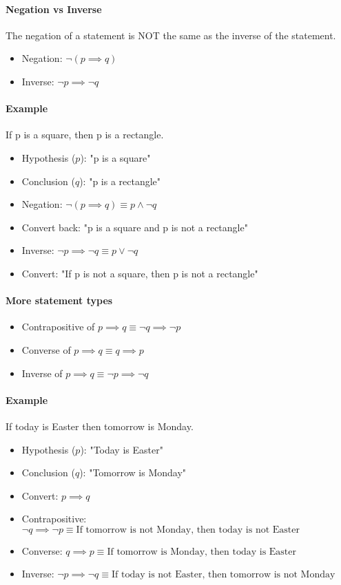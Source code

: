 \paragraph*{Negation vs Inverse}
The negation of a statement is NOT the same as the inverse of the statement.
\begin{itemize}
    \item Negation: $\neg (p \implies q)$
    \item Inverse: $\neg p \implies \neg q$
\end{itemize}

\paragraph*{Example}
If p is a square, then p is a rectangle.
\begin{itemize}
    \item Hypothesis ($p$): "p is a square"
    \item Conclusion ($q$): "p is a rectangle"
    \item Negation: $\neg (p \implies q) \equiv p \land \neg q$
    \item Convert back: "p is a square and p is not a rectangle"
    \item Inverse: $\neg p \implies \neg q \equiv p \lor \neg q$
    \item Convert: "If p is not a square, then p is not a rectangle"
\end{itemize}

\paragraph*{More statement types}
\begin{itemize}
    \item Contrapositive of $p \implies q \equiv \neg q \implies \neg p$
    \item Converse of $p \implies q \equiv q \implies p$
    \item Inverse of $p \implies q \equiv \neg p \implies \neg q$
\end{itemize}

\paragraph*{Example}
If today is Easter then tomorrow is Monday.
\begin{itemize}
    \item Hypothesis ($p$): "Today is Easter"
    \item Conclusion ($q$): "Tomorrow is Monday"
    \item Convert: $p \implies q$
    \item Contrapositive: $\neg q \implies \neg p \equiv \text{If tomorrow is not Monday, then today is not Easter}$
    \item Converse: $q \implies p \equiv \text{If tomorrow is Monday, then today is Easter}$
    \item Inverse: $\neg p \implies \neg q \equiv \text{If today is not Easter, then tomorrow is not Monday}$
\end{itemize}

